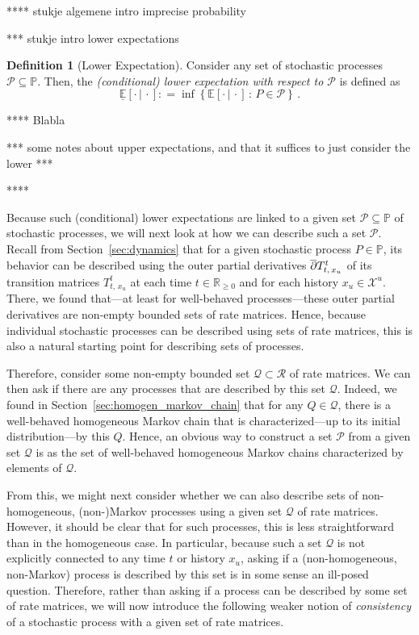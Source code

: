 \documentclass[10pt]{paper}
\theoremstyle{definition}
\newtheorem{definition}{Definition}
\newcommand{\reals}{\mathbb{R}}
\newcommand{\realsnonneg}{\reals_{\geq 0}}
\newcommand{\states}{\mathcal{X}}
\newcommand{\processes}{\mathbb{P}}
\newcommand{\rateset}{\mathcal{Q}}
\newcommand{\coloneqq}{:\!=}
\begin{document}
**** stukje algemene intro imprecise probability

*** stukje intro lower expectations

\begin{definition}[Lower Expectation]\label{def:lower_exp}
Consider any set of stochastic processes $\mathcal{P}\subseteq\processes$. Then, the \emph{(conditional) lower expectation with respect to $\mathcal{P}$} is defined as
\begin{equation*}
\underline{\mathbb{E}}[\cdot\,\vert\,\cdot] \coloneqq \inf\left\{\mathbb{E}[\cdot\,\vert\,\cdot]\,:\,P\in\mathcal{P}\right\}\,.
\end{equation*}
\end{definition}

**** Blabla

*** some notes about upper expectations, and that it suffices to just consider the lower ***

****

Because such (conditional) lower expectations are linked to a given set $\mathcal{P}\subseteq\processes$ of stochastic processes, we will next look at how we can describe such a set $\mathcal{P}$.
Recall from Section~\ref{sec:dynamics} that for a given stochastic process $P\in\processes$, its behavior can be described using the outer partial derivatives $\smash{\overline{\partial}}T_{t,\,x_u}^t$ of its transition matrices $T_{t,\,x_u}^t$ at each time $t\in\realsnonneg$ and for each history $x_u\in\states^u$. There, we found that---at least for well-behaved processes---these outer partial derivatives are non-empty bounded sets of rate matrices. Hence, because individual stochastic processes can be described using sets of rate matrices, this is also a natural starting point for describing sets of processes.

Therefore, consider some non-empty bounded set $\rateset\subset\mathcal{R}$ of rate matrices. We can then ask if there are any processes that are described by this set $\rateset$. Indeed, we found in Section~\ref{sec:homogen_markov_chain} that for any $Q\in\rateset$, there is a well-behaved homogeneous Markov chain that is characterized---up to its initial distribution---by this $Q$. Hence, an obvious way to construct a set $\mathcal{P}$ from a given set $\rateset$ is as the set of well-behaved homogeneous Markov chains characterized by elements of $\rateset$.

From this, we might next consider whether we can also describe sets of non-homogeneous, (non-)Markov processes using a given set $\rateset$ of rate matrices. However, it should be clear that for such processes, this is less straightforward than in the homogeneous case. In particular, because such a set $\rateset$ is not explicitly connected to any time $t$ or history $x_u$, asking if a (non-homogeneous, non-Markov) process is described by this set is in some sense an ill-posed question.
Therefore, rather than asking if a process can be described by some set of rate matrices, we will now introduce the following weaker notion of \emph{consistency} of a stochastic process with a given set of rate matrices.
\end{document}
